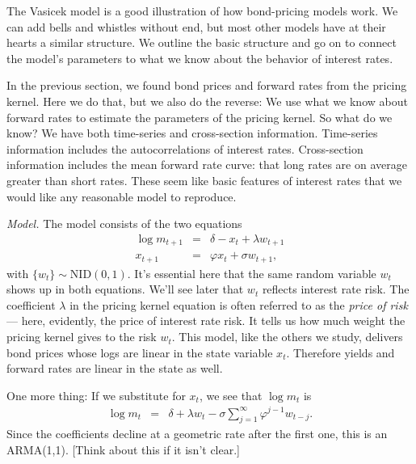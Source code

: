 \documentclass[11pt]{article}
\begin{document}
The Vasicek model is a good illustration of how bond-pricing models
work.
We can add bells and whistles without end,
but most other models have at their hearts a similar structure.
We outline the basic structure and go on to connect the model's
parameters to what we know about the behavior of interest rates.

In the previous section, we found bond prices and forward rates
from the pricing kernel.
Here we do that, but we also do the reverse:
We use what we know about forward rates
to estimate the parameters of the pricing kernel.
So what do we know?
We have both time-series and cross-section information.
Time-series information includes the autocorrelations
of interest rates.
Cross-section information includes the mean forward rate curve:
that long rates are on average greater than short rates.
These seem like basic features of interest rates that
we would like any reasonable model to reproduce.


{\it Model.\/}
The model consists of the two equations
\begin{eqnarray*}
    \log m_{t+1} &=& \delta - x_t + \lambda w_{t+1} \\
         x_{t+1} &=& \varphi x_t + \sigma w_{t+1} ,
\end{eqnarray*}
with $\{ w_t \} \sim \mbox{NID}(0,1)$.
It's essential here that the same random variable $w_t$ shows up in both equations.
We'll see later that $w_t$ reflects interest rate risk.
The coefficient $\lambda$ in the pricing kernel equation is often referred to as
the {\it price of risk\/} --- here, evidently, the price of interest rate risk.
It tells us how much weight the pricing kernel gives to the risk $w_t$.
This model, like the others we study,
delivers bond prices whose logs are linear in the state variable $x_t$.
Therefore yields and forward rates are linear in the state as well.

One more thing:
If we substitute for $x_t$, we see that $\log m_t$ is
\begin{eqnarray*}
    \log m_t &=& \delta + \lambda w_t - \sigma \sum_{j=1}^\infty \varphi^{j-1} w_{t-j} .
\end{eqnarray*}
Since the coefficients decline at a geometric rate after the first one,
this is an ARMA(1,1).
[Think about this if it isn't clear.]
\end{document}
